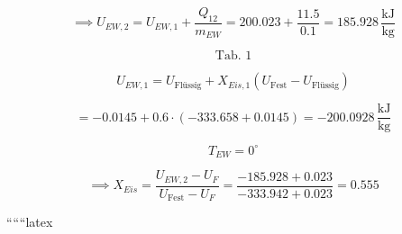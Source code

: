 \[
\implies U_{EW,2} = U_{EW,1} + \frac{Q_{12}}{m_{EW}} = 200.023 + \frac{11.5}{0.1} = 185.928 \, \frac{\text{kJ}}{\text{kg}}
\]

\[
\text{Tab. 1}
\]

\[
U_{EW,1} = U_{\text{Flüssig}} + X_{Eis,1} (U_{\text{Fest}} - U_{\text{Flüssig}})
\]

\[
= -0.0145 + 0.6 \cdot (-333.658 + 0.0145) = -200.0928 \, \frac{\text{kJ}}{\text{kg}}
\]

\[
T_{EW} = 0^\circ
\]

\[
\implies X_{Eis} = \frac{U_{EW,2} - U_{F}}{U_{\text{Fest}} - U_{F}} = \frac{-185.928 + 0.023}{-333.942 + 0.023} = 0.555
\]

``````latex


